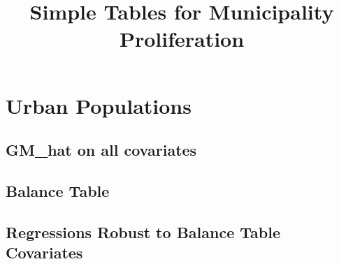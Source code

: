 \documentclass{article}
\title{Simple Tables for Municipality Proliferation}
\begin{document}
\maketitle
\tableofcontents
{\footnotesize 
\listoffigures
\listoftables}
\clearpage

\section{Urban Populations}
\subsection{GM\_hat on all covariates}

\clearpage
\subsection{Balance Table}

\clearpage

\clearpage

\clearpage

\clearpage
\subsection{Regressions Robust to Balance Table Covariates}
\begin{landscape}

\clearpage

\clearpage

\clearpage

\clearpage

\clearpage

\clearpage

\clearpage

\clearpage

\clearpage

\clearpage

\clearpage

\clearpage

\clearpage

\clearpage

\clearpage

\clearpage

\clearpage

\clearpage

\clearpage

\clearpage
\end{landscape}
\end{document}
